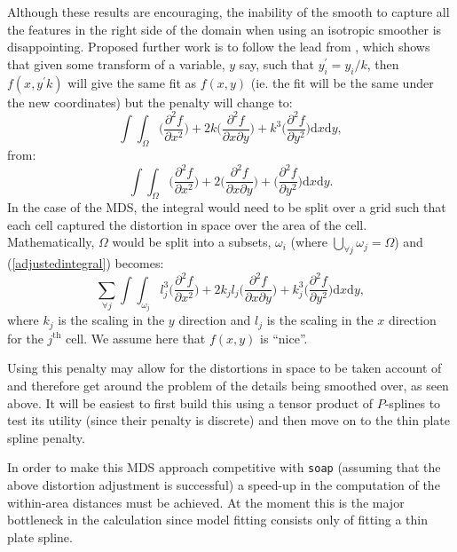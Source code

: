 \documentclass[a4paper,10pt]{article}
\begin{document}
Although these results are encouraging, the inability of the smooth to capture all the features in the right side of the domain when using an isotropic smoother is disappointing. Proposed further work is to follow the lead from \cite{wood2000}, which shows that given some transform of a variable, $y$ say, such that $y_i^\prime=y_i/k$, then $f(x,y^\prime k)$ will give the same fit as $f(x,y)$ (ie. the fit will be the same under the new coordinates) but the penalty will change to:
\begin{equation}
\int\int_\Omega \Big( \frac{\partial^2 f}{\partial x^2} \Big) + 2k\Big( \frac{\partial^2 f}{\partial x \partial y} \Big) + k^3\Big( \frac{\partial^2 f}{\partial y^2} \Big) \text{d}x \text{d}y,
\label{adjustedintegral}
\end{equation}
from:
\begin{equation*}
\int\int_\Omega \Big( \frac{\partial^2 f}{\partial x^2} \Big) + 2\Big( \frac{\partial^2 f}{\partial x \partial y} \Big) + \Big( \frac{\partial^2 f}{\partial y^2} \Big) \text{d}x \text{d}y.
\end{equation*}
In the case of the MDS, the integral would need to be split over a grid such that each cell captured the distortion in space over the area of the cell. Mathematically, $\Omega$ would be split into a subsets, $\omega_i$ (where $\bigcup_{\forall j} \omega_j = \Omega$) and (\ref{adjustedintegral}) becomes:
\begin{equation}
\sum_{\forall j} \int\int_{\omega_j} l_j^3 \Big( \frac{\partial^2 f}{\partial x^2} \Big) + 2k_jl_j\Big( \frac{\partial^2 f}{\partial x \partial y} \Big) + k_j^3\Big( \frac{\partial^2 f}{\partial y^2} \Big) \text{d}x \text{d}y,
\end{equation}
where $k_j$ is the scaling in the $y$ direction and $l_j$ is the scaling in the $x$ direction for the $j^{\text{th}}$ cell. We assume here that $f(x,y)$ is ``nice''.

Using this penalty may allow for the distortions in space to be taken account of and therefore get around the problem of the details being smoothed over, as seen above. It will be easiest to first build this using a tensor product of $P$-splines to test its utility (since their penalty is discrete) and then move on to the thin plate spline penalty.

In order to make this MDS approach competitive with \texttt{soap} (assuming that the above distortion adjustment is successful) a speed-up in the computation of the within-area distances must be achieved. At the moment this is the major bottleneck in the calculation since model fitting consists only of fitting a thin plate spline. 
\end{document}
